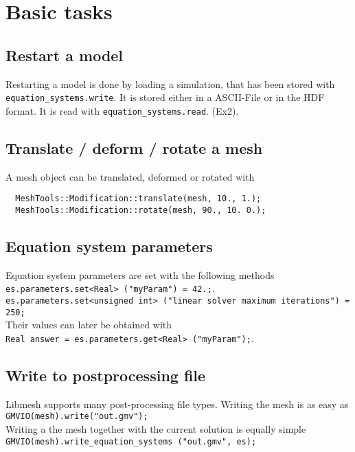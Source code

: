 \documentclass{article}
\newcommand{\exmp}[1]{\textsf{Ex#1}}
\newcommand{\code}[1]{\texttt{#1}}
\begin{document}
\section{Basic tasks}
\label{sec:basic-tasks}

\subsection{Restart a model}
\label{sec:restart}

Restarting a model is done by loading a simulation, that has been stored with 
\code{equation\_systems.write}. It is stored either in a ASCII-File or in the
HDF format. It is read with  \code{equation\_systems.read}. (\exmp{2}).

\subsection{Translate / deform / rotate a mesh}
\label{sec:translate}

A mesh object can be translated, deformed or rotated with
\begin{lstlisting}
  MeshTools::Modification::translate(mesh, 10., 1.);
  MeshTools::Modification::rotate(mesh, 90., 10. 0.);
\end{lstlisting}

\subsection{Equation system parameters}
\label{sec:EQSParameter}

Equation system parameters are set with the following methods\\[1ex]
\lstinline!es.parameters.set<Real> ("myParam") = 42.;!. \\
\lstinline!es.parameters.set<unsigned int> ("linear solver maximum iterations") = 250;! \\[1ex]
Their values can later be obtained with \\[1ex]
\lstinline!Real answer = es.parameters.get<Real> ("myParam");!. \\

\subsection{Write to postprocessing file}
\label{sec:postprocessing}

Libmesh supports many post-processing file types. Writing the mesh is as easy as\\[1ex]
\lstinline!GMVIO(mesh).write("out.gmv");!\\[1ex]
Writing a the mesh together with the current solution is equally simple\\[1ex]
\lstinline!GMVIO(mesh).write_equation_systems ("out.gmv", es);!
\end{document}
